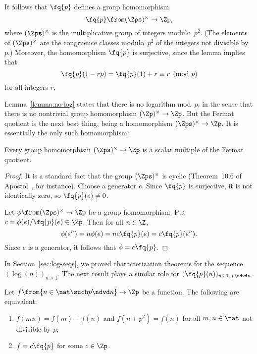 It follows that $\fq{p}$ defines a group homomorphism
\[
\fq{p} \from (\Zps)^\times \to \Zp,
\]
where $(\Zps)^\times$ is the multiplicative group of integers
modulo~$p^2$.  (The elements of $(\Zps)^\times$ are the congruence
classes modulo~$p^2$ of the integers not divisible by $p$.)  Moreover, the
homomorphism $\fq{p}$ is surjective, since the lemma implies that
\[
\fq{p}(1 - rp) = \fq{p}(1) + r \equiv r \pmod{p}
\]
for all integers $r$.

Lemma~\ref{lemma:no-log} states that there is no logarithm mod~$p$, in the
sense that there is no nontrivial group homomorphism $(\Zp)^\times \to
\Zp$.  But the Fermat quotient is the next best thing, being a homomorphism
$(\Zps)^\times \to \Zp$.  It is essentially the only such homomorphism:

\begin{propn}
Every group homomorphism $(\Zps)^\times \to \Zp$ is a scalar multiple of
the Fermat quotient.
\end{propn}

\begin{proof}
It is a standard fact that the group $(\Zps)^\times$ is cyclic
(Theorem~10.6 of Apostol~\cite{AposIAN}, for instance).  Choose a generator
$e$.  Since $\fq{p}$ is surjective, it is not identically zero, so
$\fq{p}(e) \neq 0$.

Let $\phi\from (\Zps)^\times \to \Zp$ be a group homomorphism.  Put $c =
\phi(e)/\fq{p}(e) \in \Zp$.  Then for all $n \in \Z$,
\[
\phi(e^n) = n\phi(e) = nc\fq{p}(e) = c\fq{p}(e^n).
\]
Since $e$ is a generator, it follows that $\phi = c\fq{p}$.
\end{proof}

In Section~\ref{sec:log-seqs}, we proved characterization theorems for the
sequence $(\log(n))_{n \geq 1}$.  The next result plays a similar role for
$(\fq{p}(n))_{n \geq 1,\:p \ndvd n}$.  

\begin{thm}
% 
Let $f \from \{ n \in \nat \such p \ndvd n \} \to \Zp$ be a function.  The
following are equivalent:
% 
\begin{enumerate}
\item 
{}
$f(mn) = f(m) + f(n)$ and $f(n + p^2) = f(n)$ for all $m, n \in \nat$ not
divisible by $p$;

\item
{}
$f = c\fq{p}$ for some $c \in \Zp$.
\end{enumerate}
\end{thm}

